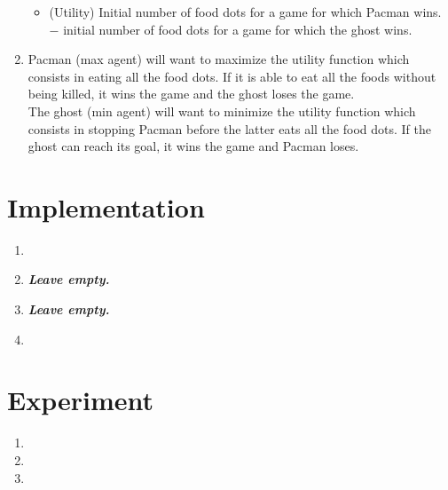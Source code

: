 \documentclass{article}
\begin{document}
\begin{enumerate}[label=\alph*.,leftmargin=*]
\begin{itemize}
			\item (Utility) Initial number of food dots for a game for which Pacman wins.\\\hspace*{1.2cm}
			$-$ initial number of food dots for a game for which the ghost wins.
    	\end{itemize}
    	
    \item Pacman (max agent) will want to maximize the utility function which consists in eating all the food dots. If it is able to eat all the foods without being killed, it wins the game and the ghost loses the game.\\
    The ghost (min agent) will want to minimize the utility function which consists in stopping Pacman before the latter eats all the food dots. If the ghost can reach its goal, it wins the game and Pacman loses.\\
\end{enumerate}

\section{Implementation}

\begin{enumerate}[label=\alph*.,leftmargin=*]
    \item
    \item \textbf{\textit{Leave empty.}}
    \item \textbf{\textit{Leave empty.}}
    \item
\end{enumerate}

\section{Experiment}

\begin{enumerate}[label=\alph*.,leftmargin=*]
    \item
    \item
    \item
\end{enumerate}



\end{document}
